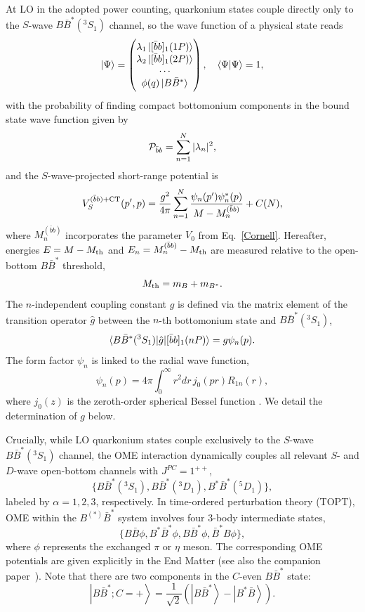 \documentclass[aps,prl,showpacs,amsmath,twocolumn,superscriptaddress,floatfix,nofootinbib,notitlepage]{revtex4-2}
\newcommand{\bbnP}{[\bar{b}b]_1(nP)}
\newcommand{\bbarb}{[\bar{b}b]_1}
\newcommand{\Mbb}{M^{(\bar{b}b)}}
\newcommand{\be}{\begin{equation}}
\newcommand{\ee}{\end{equation}}
\newcommand{\QQ}{\bar{b}b}
\newcommand{\En}{E_n}
\begin{document}
At LO in the adopted power counting, quarkonium states couple directly only to the $S$-wave $B\bar{B}^*(^3S_1)$ channel, so the wave function of a physical state reads
\be
|\Psi\rangle=
\begin{pmatrix}
\lambda_1\ket{\bbarb(1P)}\\ \lambda_2\ket{\bbarb(2P)}\\ \cdots\\ \phi(q)\ket{B\bar{B}^*}
\end{pmatrix},\quad \braket{\Psi|\Psi}=1,
\label{state}
\ee
with the probability of finding compact bottomonium components in the bound state wave function given by
\be
{\cal P}_{\bar{b}b}
=\sum_{n=1}^N|\lambda_n|^2,
\label{Pbb}
\ee
and the $S$-wave-projected 
short-range
potential is \cite{Zhang:2026iyr}
\be
V^{(\QQ)+{\rm CT}}_S(p',p)=\frac{g^2}{4\pi}
\sum_{n=1}^N\frac{\psi_n(p')\psi^*_n(p)}{M-\Mbb_n}+C(N),
\label{VQMab}
\ee
where $\Mbb_n$ incorporates the parameter $V_0$ from Eq.~\eqref{Cornell}. Hereafter, energies $E=M-M_{\rm th}$ and $\En=\Mbb_n-M_{\rm th}$ are measured relative to the open-bottom $B\bar{B}^*$ threshold,
\be
M_{\rm th}=m_B+m_{B^*}.
\label{Mth}
\ee
The $n$-independent coupling constant $g$ is defined via the matrix element of the transition operator $\hat{g}$ between the $n$-th bottomonium state and $B\bar{B}^*(^3S_1)$,
\be
\braket{B\bar{B}^*(^3S_1)|\hat{g}|\bbnP}=g\psi_n(p).
\label{psigMM}
\ee
The form factor $\psi_n$ is linked to the radial wave function,
\be
\psi_n(p)=
4\pi \int_0^\infty r^2dr\, j_0(pr)R_{1n}(r),
\label{psinp}
\ee
where $j_0(z)$ is the zeroth-order spherical Bessel function \cite{Zhang:2026iyr}. We detail the determination of $g$ below.

Crucially, while LO quarkonium states couple exclusively to the $S$-wave $B\bar{B}^*(^3S_1)$ channel, the OME interaction dynamically couples all relevant $S$- and $D$-wave open-bottom channels with $J^{PC}=1^{++}$,
\be
\{B\bar{B}^*(^3S_1),B\bar{B}^*(^3D_1),B^*\bar{B}^*(^5D_1)\},
\label{BBchannels}
\ee
labeled by $\alpha=1,2,3$, respectively.
In time-ordered perturbation theory (TOPT), OME within the $B^{(*)}\bar{B}^*$ system involves four 3-body intermediate states,
\be
\{B\bar{B}\phi,B^*\bar{B}^*\phi,B\bar{B}^*\phi,\bar{B}^*B\phi\},
\label{BBphichannels}
\ee
where $\phi$ represents the exchanged $\pi$ or $\eta$ meson.
The corresponding OME potentials are given explicitly in the End Matter (see also the companion paper~\cite{Zhang:2026iyr}).
Note that there are two components in the $C$-even $B\bar{B}^*$ state:
\be
\left|B \bar{B}^* ; C=+\right\rangle=\frac{1}{\sqrt{2}}\left(\left|B \bar{B}^*\right\rangle-\left|B^* \bar{B}\right\rangle\right).
\ee
\end{document}
